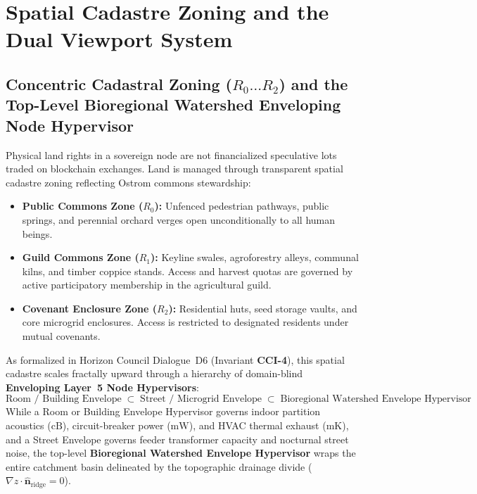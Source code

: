 \section{Spatial Cadastre Zoning and the Dual Viewport System}
\label{sec:cadastre_dual_viewport}

\subsection{Concentric Cadastral Zoning \texorpdfstring{($R_0 \dots R_2$)}{(R0 ... R2)} and the Top-Level Bioregional Watershed Enveloping Node Hypervisor}
Physical land rights in a sovereign node are not financialized speculative lots traded on blockchain exchanges. Land is managed through transparent spatial cadastre zoning reflecting Ostrom commons stewardship:
\begin{itemize}
    \item \textbf{Public Commons Zone ($R_0$):} Unfenced pedestrian pathways, public springs, and perennial orchard verges open unconditionally to all human beings.
    \item \textbf{Guild Commons Zone ($R_1$):} Keyline swales, agroforestry alleys, communal kilns, and timber coppice stands. Access and harvest quotas are governed by active participatory membership in the agricultural guild.
    \item \textbf{Covenant Enclosure Zone ($R_2$):} Residential huts, seed storage vaults, and core microgrid enclosures. Access is restricted to designated residents under mutual covenants.
\end{itemize}

As formalized in Horizon Council Dialogue~D6 (Invariant \textbf{CCI-4}), this spatial cadastre scales fractally upward through a hierarchy of domain-blind \textbf{Enveloping Layer~5 Node Hypervisors}:
\begin{equation}
\text{Room / Building Envelope} \;\subset\; \text{Street / Microgrid Envelope} \;\subset\; \text{Bioregional Watershed Envelope Hypervisor}
\label{eq:fractal_watershed_envelope}
\end{equation}
While a Room or Building Envelope Hypervisor governs indoor partition acoustics ($\mathrm{cB}$), circuit-breaker power ($\mathrm{mW}$), and HVAC thermal exhaust ($\mathrm{mK}$), and a Street Envelope governs feeder transformer capacity and nocturnal street noise, the top-level \textbf{Bioregional Watershed Envelope Hypervisor} wraps the entire catchment basin delineated by the topographic drainage divide ($\nabla z \cdot \hat{\mathbf{n}}_{\mathrm{ridge}} = 0$). 

